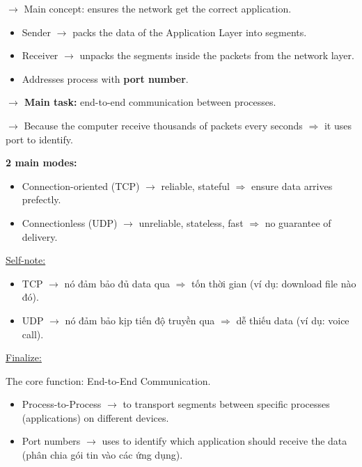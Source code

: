 \noindent
$\rightarrow$ Main concept: ensures the network get the correct application.
\medskip

\begin{itemize}
    \item Sender $\rightarrow$ packs the data of the Application Layer into segments.
    \item Receiver $\rightarrow$ unpacks the segments inside the packets from the network layer.
    \item Addresses process with \textbf{port number}.
\end{itemize}
\medskip

\noindent
\textbf{$\rightarrow$ Main task:} end-to-end communication between processes.
\medskip

\noindent
$\rightarrow$ Because the computer receive thousands of packets every seconds $\Rightarrow$ it uses port to identify.
\medskip

\noindent
\textbf{2 main modes:}

\begin{itemize}
    \item Connection-oriented (TCP) $\rightarrow$ reliable, stateful $\Rightarrow$ ensure data arrives prefectly.
    \item Connectionless (UDP) $\rightarrow$ unreliable, stateless, fast $\Rightarrow$ no guarantee of delivery.
\end{itemize}
\medskip

\noindent
\underline{Self-note:}

\begin{itemize}
    \item TCP $\rightarrow$ nó đảm bảo đủ data qua $\Rightarrow$ tốn thời gian (ví dụ: download file nào đó).
    \item UDP $\rightarrow$ nó đảm bảo kịp tiến độ truyền qua $\Rightarrow$ dễ thiếu data (ví dụ: voice call).
\end{itemize}

\noindent
\underline{Finalize:}
\medskip

\noindent
The core function: End-to-End Communication.

\begin{itemize}
    \item Process-to-Process $\rightarrow$ to transport segments between specific processes (applications) on different devices.
    \item Port numbers $\rightarrow$ uses to identify which application should receive the data (phân chia gói tin vào các ứng dụng).
\end{itemize}
\medskip

